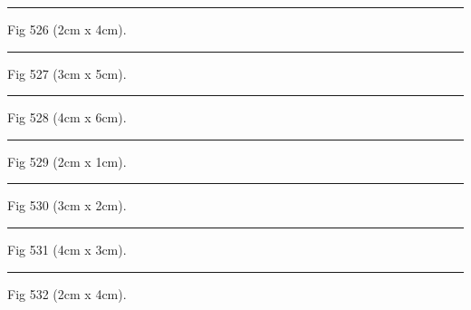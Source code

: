 \documentclass[a4paper,11pt]{article}
\begin{document}
\begin{swarmwrap}%
  \begin{minipage}[t]{2cm}
    \centering
    \rule{\linewidth}{4cm}
    {\footnotesize Fig 526 (2cm x 4cm).}
  \end{minipage}%
\end{swarmwrap}%
\swarmwrapnext
\lipsum[76]%

\begin{swarmwrap}%
  \begin{minipage}[t]{3cm}
    \centering
    \rule{\linewidth}{5cm}
    {\footnotesize Fig 527 (3cm x 5cm).}
  \end{minipage}%
\end{swarmwrap}%
\swarmwrapnext
\lipsum[77]%

\begin{swarmwrap}%
  \begin{minipage}[t]{4cm}
    \centering
    \rule{\linewidth}{6cm}
    {\footnotesize Fig 528 (4cm x 6cm).}
  \end{minipage}%
\end{swarmwrap}%
\swarmwrapnext
\lipsum[78]%

\begin{swarmwrap}%
  \begin{minipage}[t]{2cm}
    \centering
    \rule{\linewidth}{1cm}
    {\footnotesize Fig 529 (2cm x 1cm).}
  \end{minipage}%
\end{swarmwrap}%
\swarmwrapnext
\lipsum[79]%

\begin{swarmwrap}%
  \begin{minipage}[t]{3cm}
    \centering
    \rule{\linewidth}{2cm}
    {\footnotesize Fig 530 (3cm x 2cm).}
  \end{minipage}%
\end{swarmwrap}%
\swarmwrapnext
\lipsum[80]%

\begin{swarmwrap}%
  \begin{minipage}[t]{4cm}
    \centering
    \rule{\linewidth}{3cm}
    {\footnotesize Fig 531 (4cm x 3cm).}
  \end{minipage}%
\end{swarmwrap}%
\swarmwrapnext
\lipsum[81]%

\begin{swarmwrap}%
  \begin{minipage}[t]{2cm}
    \centering
    \rule{\linewidth}{4cm}
    {\footnotesize Fig 532 (2cm x 4cm).}
  \end{minipage}%
\end{swarmwrap}%
\swarmwrapnext
\lipsum[82]%
\end{document}

